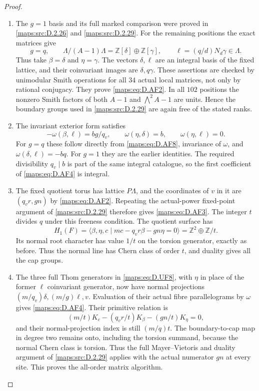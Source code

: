 \begin{proof}
\begin{enumerate}[label=\arabic*.,leftmargin=*]
\item The $g=1$ basis and its full marked comparison were proved in
\ref{maps:src:D.2.26} and \ref{maps:src:D.2.29}. For the remaining positions the exact
matrices give
\[
 g=q,\qquad
 \Lambda/(A-1)\Lambda=\mathbb Z[\delta]\oplus\mathbb Z[\gamma],
 \qquad
 \ell=(q/d)N_d\gamma\in\Lambda.                            \tag{D.AF8}\label{maps:eq:D.AF8}
\]
Thus take $\beta=\delta$ and $\eta=\gamma$.
The vectors $\delta,\ell$ are an integral basis of the fixed
lattice, and their coinvariant images are $\delta,q\gamma$.
These assertions are checked by unimodular Smith operations
for all $34$ actual local matrices, not only by rational
conjugacy. They prove \eqref{maps:eq:D.AF2}. In all $102$ positions the
nonzero Smith factors of both $A-1$ and
$\bigwedge^2A-1$ are units. Hence the boundary groups used
in \ref{maps:src:D.2.29} are again free of the stated ranks.

\item The invariant exterior form satisfies
\[
 -\omega(\beta,\ell)=bg/q_v,\qquad
 \omega(\eta,\delta)=b,\qquad
 \omega(\eta,\ell)=0.
\]
For $g=q$ these follow directly from \eqref{maps:eq:D.AF8}, invariance of
$\omega$, and $\omega(\delta,\ell)=-bq$.
For $g=1$ they are the earlier identities. The required
divisibility $q_v\mid b$ is part of the same integral
catalogue, so the first coefficient of \eqref{maps:eq:D.AF4} is integral.

\item The fixed quotient torus has lattice $P\Lambda$, and the
coordinates of $v$ in it are $(q_vr,gn)$ by \eqref{maps:eq:D.AF2}.
Repeating the actual-power fixed-point argument of \ref{maps:src:D.2.29}
therefore gives \eqref{maps:eq:D.AF3}. The integer $t$ divides $q$ under
this freeness condition. The quotient surface has
\[
 H_1(F)=\langle\beta,\eta,c\mid
                   mc-q_vr\beta-gn\eta=0\rangle
       =\mathbb Z^2\oplus\mathbb Z/t.
\]
Its normal root character has value $1/t$ on the torsion
generator, exactly as before. Thus the normal line has Chern
class of order $t$, and duality gives all the cap groups.

\item The three full Thom generators in \eqref{maps:eq:D.UF8}, with $\eta$ in
place of the former $\ell$ coinvariant generator, now have
normal projections $(m/q_v)\delta,(m/g)\ell,v$.
Evaluation of their actual fibre parallelograms by $\omega$
gives \eqref{maps:eq:D.AF4}. Their primitive relation is
\[
 (m/t)K_c-(q_vr/t)K_\beta-(gn/t)K_\eta=0,
\]
and their normal-projection index is still $(m/q)t$.
The boundary-to-cap map in degree two remains onto, including
the torsion summand, because the normal Chern class is
torsion. Thus the full Mayer--Vietoris and duality argument of
\ref{maps:src:D.2.29} applies with the actual numerator $gn$ at every site.
This proves the all-order matrix algorithm.


\end{enumerate}
\end{proof}
